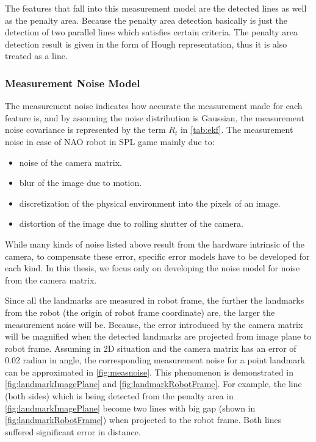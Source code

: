 The features that fall into this measurement model are the detected lines as well as the penalty area. Because the penalty area detection basically is just the detection of two parallel lines which satisfies certain criteria. The penalty area detection result is given in the form of Hough representation, thus it is also treated as a line.

\subsubsection{Measurement Noise Model}
\label{sub:Measurement Noise Model}
The measurement noise indicates how accurate the measurement made for each feature is, and by assuming the noise distribution is Gaussian, the measurement noise covariance is represented by the term $R_{t}$ in \autoref{tab:ekf}. The measurement noise in case of NAO robot in \gls{SPL} game mainly due to:
\begin{itemize}
  \item noise of the camera matrix.
  \item blur of the image due to motion.
  \item discretization of the physical environment into the pixels of an image.
  \item distortion of the image due to rolling shutter of the camera.
\end{itemize}
While many kinds of noise listed above result from the hardware intrinsic of the camera, to compensate these error, specific error models have to be developed for each kind. In this thesis, we focus only on developing the noise model for noise from the camera matrix.

Since all the landmarks are measured in robot frame, the further the landmarks from the robot (the origin of robot frame coordinate) are, the larger the measurement noise will be. Because, the error introduced by the camera matrix will be magnified when the detected landmarks are projected from image plane to robot frame. Assuming in 2D situation and the camera matrix has an error of 0.02 radian in angle, the corresponding measurement noise for a point landmark can be approximated in \autoref{fig:measnoise}. This phenomenon is demonstrated in \autoref{fig:landmarkImagePlane} and \ref{fig:landmarkRobotFrame}. For example, the line (both sides) which is being detected from the penalty area in \autoref{fig:landmarkImagePlane} become two lines with big gap (shown in \autoref{fig:landmarkRobotFrame}) when projected to the robot frame. Both lines suffered significant error in distance.\\

